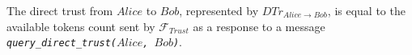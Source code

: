 \begin{definition}
  The direct trust from $Alice$ to $Bob$, represented by $DTr_{Alice \rightarrow Bob}$, is equal to the available tokens count
  sent by $\mathcal{F}_{Trust}$ as a response to a message \emph{\texttt{query\_direct\_trust(}$Alice$\texttt{,
  }$Bob$\texttt{)}}.
\end{definition}


